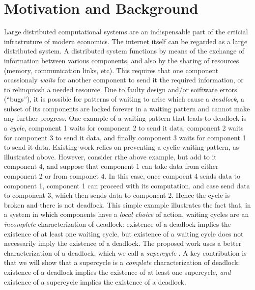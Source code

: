 \section{Motivation and Background}

Large distributed computational systems are an indispensable part of the crticial infrastruture of modern economics. The internet itself can be
regarded as a large distributed system.
%
A distributed system functions by means of the exchange of information between various components, and also by the sharing of resources (\eg memory,
communication links, etc). This requires that one component ocassionaly \emph{waits} for another component to send it the required information, or to
relinquicsh a needed resource.  Due to faulty design and/or soiftware errors (``bugs''), it is possible for patterns of waiting to arise which cause a
{\em deadlock}, \ie a subset of its components are locked forever in a waiting pattern and cannot make any further progress.
%
One example of a waiting pattern that leads to deadlock is a \emph{cycle}, \eg component 1 waits for component 2 to send it data, 
component 2 waits for component 3 to send it data, and finally 
component 3 waits for component 1 to send it data.
%
Existing work relies on preventing a cyclic waiting pattern, as illustrated above. However, consider rthe above example, but add to it component 4,
and suppose that component 1 can take data from either component 2 or from componet 4. In this case, once compoent 4 sends data to component 1,
component 1 can proceed with its computation, and case send data to component 3, which then sends data to component 2. Hence the cycle is broken and
there is not deadlock.
%
This simple example illustrates the fact that, in a system in which components have a \emph{local choice} of action, waiting cycles are an
\emph{incomplete} characterization of deadlock: existence of a deadlock implies the existence of at least one waiting cycle, but existence of a
waiting cycle does not necessarily imply the existence of a deadlock.
%
The proposed work uses a better characterization of a deadlock, which we call a \emph{supercycle} \cite{FORTE13}. 
A key contribution is that we will show that a supercycle is a 
\emph{complete} characterization of deadlock: existence of a deadlock implies the existence of at least one supercycle, \emph{and} existence of a
supercycle implies the existence of a deadlock.

